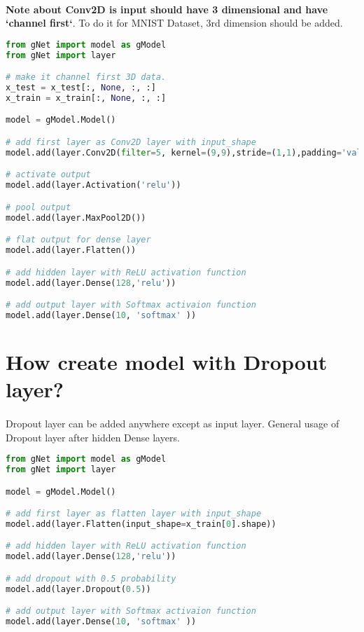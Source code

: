 \documentclass[12pt]{report}
\begin{document}
\paragraph{}
\textbf{Note about Conv2D is input should have 3 dimensional and have `channel first`}. To do it for MNIST Dataset, 3rd dimension should be added.


\begin{lstlisting}[language=Python, numbers=none, caption={Create CNN model.}, label={ex:create-cnn-model}]
from gNet import model as gModel
from gNet import layer

# make it channel first 3D data.
x_test = x_test[:, None, :, :]
x_train = x_train[:, None, :, :]

model = gModel.Model()

# add first layer as Conv2D layer with input_shape
model.add(layer.Conv2D(filter=5, kernel=(9,9),stride=(1,1),padding='valid', input_shape=x_train[0].shape, use_bias=True))

# activate output
model.add(layer.Activation('relu'))

# pool output
model.add(layer.MaxPool2D())

# flat output for dense layer
model.add(layer.Flatten())

# add hidden layer with ReLU activation function
model.add(layer.Dense(128,'relu'))

# add output layer with Softmax activaion function 
model.add(layer.Dense(10, 'softmax' ))

\end{lstlisting}



\section{How create model with Dropout layer?}
\paragraph{}
Dropout layer can be added anywhere except as input layer. General usage of Dropout layer after hidden Dense layers. 

\begin{lstlisting}[language=Python, numbers=none, caption={Create model with Dropout.}, label={ex:create-dropout-model}]
from gNet import model as gModel
from gNet import layer

model = gModel.Model()

# add first layer as flatten layer with input_shape
model.add(layer.Flatten(input_shape=x_train[0].shape))

# add hidden layer with ReLU activation function
model.add(layer.Dense(128,'relu'))

# add dropout with 0.5 probability
model.add(layer.Dropout(0.5))

# add output layer with Softmax activaion function 
model.add(layer.Dense(10, 'softmax' ))

\end{lstlisting}
\end{document}
